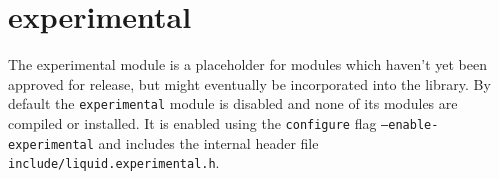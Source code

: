 % 
%

\newpage
\section{experimental}
\label{module:experimental}

The experimental module is a placeholder for modules which haven't yet
been approved for release, but might eventually be incorporated into the
library.
By default the {\tt experimental} module is disabled and none of its
modules are compiled or installed.
It is enabled using the {\tt configure} flag {\tt --enable-experimental}
and includes the internal header file
{\tt include/liquid.experimental.h}.

